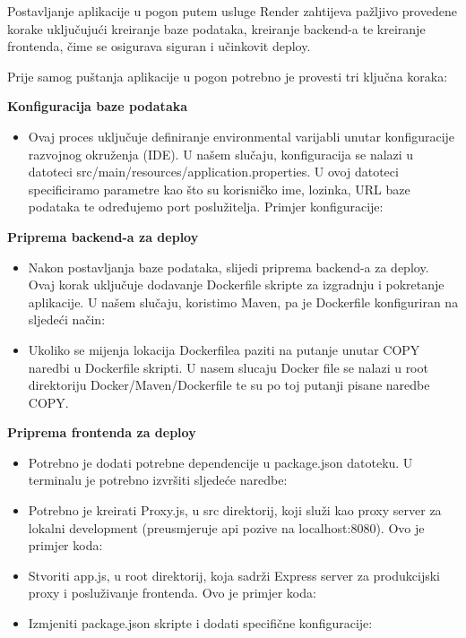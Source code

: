 			
			Postavljanje aplikacije u pogon putem usluge Render zahtijeva pažljivo provedene korake uključujući kreiranje baze podataka, kreiranje backend-a  te kreiranje frontenda, čime se osigurava siguran i učinkovit deploy.
			
			Prije samog puštanja aplikacije u pogon potrebno je provesti tri ključna koraka:
			\begin{packed_enum}
				\item \textbf{Konfiguracija baze podataka}
				\begin{itemize}
					\item Ovaj proces uključuje definiranje environmental varijabli unutar konfiguracije razvojnog okruženja (IDE). U našem slučaju, konfiguracija se nalazi u datoteci src/main/resources/application.properties. U ovoj datoteci specificiramo parametre kao što su korisničko ime, lozinka, URL baze podataka te određujemo port poslužitelja. Primjer konfiguracije:
				\end{itemize}
				
				\item \textbf{Priprema backend-a za deploy}
				\begin{itemize}
					\item Nakon postavljanja baze podataka, slijedi priprema backend-a za deploy. Ovaj korak uključuje dodavanje Dockerfile skripte za izgradnju i pokretanje aplikacije.  U našem slučaju, koristimo Maven, pa je Dockerfile konfiguriran na sljedeći način:
					\item Ukoliko se mijenja lokacija Dockerfilea paziti na putanje unutar COPY naredbi u Dockerfile skripti. U nasem slucaju Docker file se nalazi u root direktoriju Docker/Maven/Dockerfile te su po toj putanji pisane naredbe COPY.
				\end{itemize}
				
				\item \textbf{Priprema frontenda za deploy}
				\begin{itemize}
					\item Potrebno je dodati potrebne dependencije u package.json datoteku. U terminalu je potrebno izvršiti sljedeće naredbe:
					\item Potrebno je kreirati Proxy.js, u src direktorij, koji služi kao proxy server za lokalni development (preusmjeruje api pozive na localhost:8080). Ovo je primjer koda:
					\item Stvoriti app.js, u root direktorij, koja sadrži Express server za produkcijski proxy i posluživanje frontenda. Ovo je primjer koda:
					\item Izmjeniti package.json skripte i dodati specifične konfiguracije:
				\end{itemize}
			\end{packed_enum}
			

